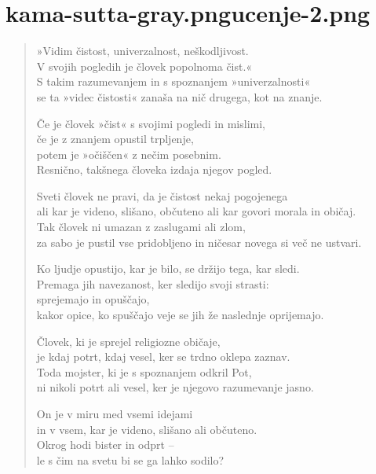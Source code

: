
\chapter[Suddhaṭṭhaka Sutta]{{kama-sutta-gray.png}{ucenje-2.png}}


\begin{verse}


»Vidim čistost, univerzalnost, neškodljivost.\\
V svojih pogledih je človek popolnoma čist.«\\
S takim razumevanjem in s spoznanjem »univerzalnosti«\\
se ta »videc čistosti« zanaša na nič drugega, kot na znanje.

Če je človek »čist« s svojimi pogledi in mislimi,\\
če je z znanjem opustil trpljenje,\\
potem je »očiščen« z nečim posebnim.\\
Resnično, takšnega človeka izdaja njegov pogled.

Sveti človek ne pravi, da je čistost nekaj pogojenega\\
ali kar je videno, slišano, občuteno ali kar govori morala in običaj.\\
Tak človek ni umazan z zaslugami ali zlom,\\
za sabo je pustil vse pridobljeno in ničesar novega si več ne ustvari.

Ko ljudje opustijo, kar je bilo, se držijo tega, kar sledi.\\
Premaga jih navezanost, ker sledijo svoji strasti:\\
sprejemajo in opuščajo,\\
kakor opice, ko spuščajo veje se jih že naslednje oprijemajo.

Človek, ki je sprejel religiozne običaje,\\
je kdaj potrt, kdaj vesel, ker se trdno oklepa zaznav.\\
Toda mojster, ki je s spoznanjem odkril Pot,\\
ni nikoli potrt ali vesel, ker je njegovo razumevanje jasno.

On je v miru med vsemi idejami\\
in v vsem, kar je videno, slišano ali občuteno.\\
Okrog hodi bister in odprt --\\
le s čim na svetu bi se ga lahko sodilo?


\end{verse}
